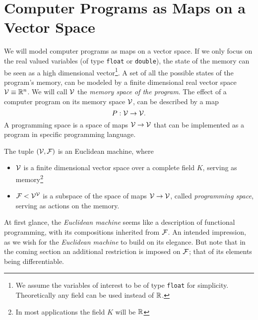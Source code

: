 \section{Computer Programs as Maps on a Vector Space}

We will model computer programs as maps on a vector space. If
we only focus on the real valued variables (of type \texttt{float} or
\texttt{double}), the state of the memory can be seen as a high
dimensional vector\footnote{We assume the variables of interest to be of type \texttt{float} for
  simplicity. Theoretically any field can be used instead of $\mathbb{R}$.}. 
A set of all the possible states of the program's memory,
can be modeled by a finite dimensional real vector space $\mathcal{V}\equiv \mathbb{R}^n$. We
will call $\mathcal{V}$ the \emph{memory space of the program}. The effect of a computer
program on its memory space $\mathcal{V}$, can be described by a map
\begin{equation}
  \label{eq:map}
  P:\mathcal{V}\to \mathcal{V}.
\end{equation}
A programming space is a space of maps $\mathcal{V}\to\mathcal{V}$ that can be implemented as a
program in specific programming language. 
\begin{definition} The tuple $(\mathcal{V},\mathcal{F})$ is an Euclidean machine, where
  \begin{itemize}
  \item
  $\mathcal{V}$ is a finite dimensional vector space over a complete field $K$, serving
  as memory\footnote{In most applications the field $K$ will
    be $\mathbb{R}$}
  \item
  $\mathcal{F}< \mathcal{V}^{\mathcal{V}}$ is a subspace of the space of maps $\mathcal{V}\to \mathcal{V}$, called \emph{programming space}, serving as actions on the memory.
  \end{itemize}  
\end{definition}

At first glance, the \emph{Euclidean machine} seems like a description of functional programming, with its compositions inherited from $\mathcal{F}$. An intended impression, as we wish for the \emph{Euclidean machine} to build on its elegance. But note that in the coming section an additional restriction is imposed on $\mathcal{F}$; that of its elements being differentiable.


